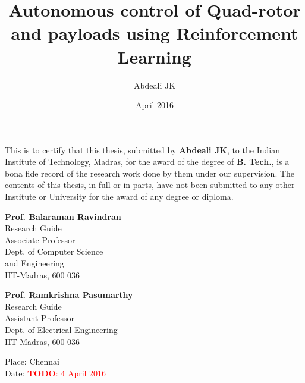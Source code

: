 \documentclass[BTech]{iitmdiss}
\newcommand\todo[1]{\textcolor{red}{{\bf TODO}: #1}}
\begin{document}

\title{Autonomous control of Quad-rotor and payloads using Reinforcement Learning}

\author{Abdeali JK}

\date{April 2016}

\maketitle

\certificate

\vspace*{0.5in}

\noindent This is to certify that this thesis, submitted by {\bf Abdeali JK}, to the Indian Institute of Technology, Madras, for the award of the degree of {\bf B. Tech.}, is a bona fide record of the research work done by them under our supervision. The contents of this thesis, in full or in parts, have not been submitted to any other Institute or University for the award of any degree or diploma.

\vspace*{1.5in}

\begin{singlespacing}

\begin{minipage}[t]{0.45\textwidth}
  {\bf Prof. Balaraman Ravindran} \\
  Research Guide \\
  Associate Professor \\
  Dept. of Computer Science \\
  and Engineering \\
  IIT-Madras, 600 036
\end{minipage}
\hfill
\begin{minipage}[t]{0.45\textwidth}
  {\bf Prof. Ramkrishna Pasumarthy} \\
  Research Guide \\
  Assistant Professor \\
  Dept. of Electrical Engineering \\
  IIT-Madras, 600 036
\end{minipage}

\end{singlespacing}

\vspace*{0.25in}
\noindent Place: Chennai\\
Date: \todo{4 April 2016}
\end{document}
